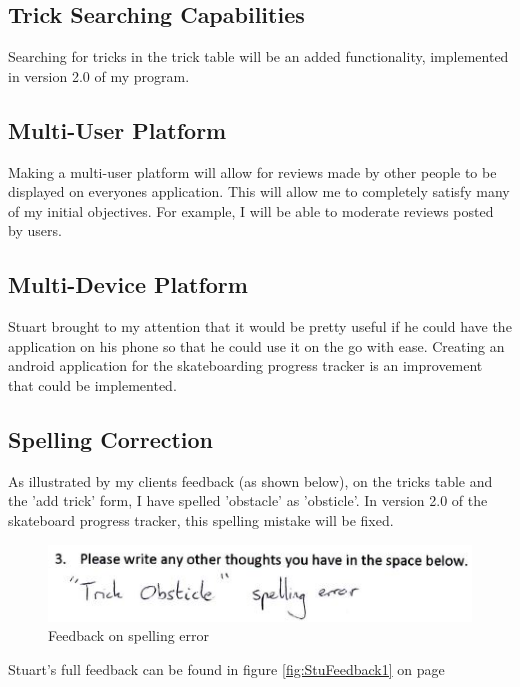 	\subsection{Trick Searching Capabilities}

Searching for tricks in the trick table will be an added functionality, implemented in version 2.0 of my program.

	\subsection{Multi-User Platform}

Making a multi-user platform will allow for reviews made by other people to be displayed on everyones application. This will allow me to completely satisfy many of my initial objectives. For example, I will be able to moderate reviews posted by users.

	\subsection{Multi-Device Platform}

Stuart brought to my attention that it would be pretty useful if he could have the application on his phone so that he could use it on the go with ease. Creating an android application for the skateboarding progress tracker is an improvement that could be implemented.

	\subsection{Spelling Correction}

As illustrated by my clients feedback (as shown below), on the tricks table and the 'add trick' form, I have spelled 'obstacle' as 'obsticle'. In version 2.0 of the skateboard progress tracker, this spelling mistake will be fixed.

\begin{figure}[H]
    \includegraphics[width=\textwidth]{./Evaluation/images/StuSpellingError.jpg}
    \caption{Feedback on spelling error} \label{fig:StuSpellingError}
\end{figure}

Stuart's full feedback can be found in figure \ref{fig:StuFeedback1} on page \pageref{fig:StuFeedback1}





